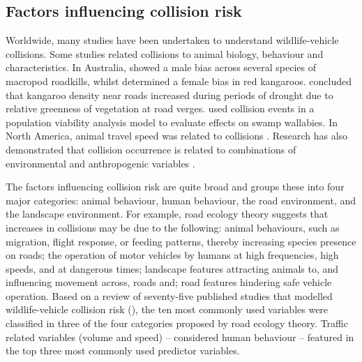 
\subsection{Factors influencing collision risk}

Worldwide, many studies have been undertaken to understand wildlife-vehicle collisions.  Some studies related collisions to animal biology, behaviour and characteristics. In Australia, \cite{coul97} showed a male bias across several species of macropod roadkills, whilst \cite{kloc06} determined a female bias in red kangaroos.  \cite{lee04} concluded that kangaroo density near roads increased during periods of drought due to relative greenness of vegetation at road verges. \cite{ramp06b} used collision events in a population viability analysis model to evaluate effects on swamp wallabies.  In North America, animal travel speed was related to collisions \citep{litv08}. Research has also demonstrated that collision occurrence is related to combinations of environmental and anthropogenic variables \citep{barn07}.

The factors influencing collision risk are quite broad and \cite{form03} groups these into four major categories: animal behaviour, human behaviour, the road environment, and the landscape environment. For example, road ecology theory suggests that increases in collisions may be due to the following: animal behaviours, such as migration, flight response, or feeding patterns, thereby increasing species presence on roads; the operation of motor vehicles by humans at high frequencies, high speeds, and at dangerous times; landscape features attracting animals to, and influencing movement across, roads and; road features hindering safe vehicle operation. Based on a review of seventy-five published studies that modelled wildlife-vehicle collision risk (), the ten most commonly used variables were classified in three of the four categories proposed by road ecology theory. Traffic related variables (volume and speed) -- considered human behaviour -- featured in the top three most commonly used predictor variables.


